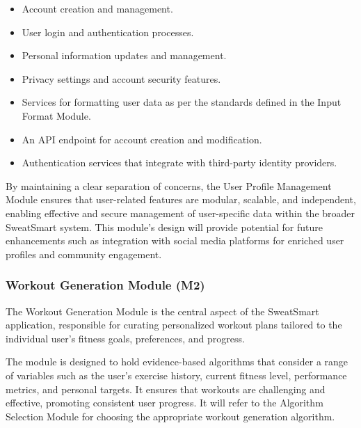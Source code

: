 \documentclass[12pt, titlepage]{article}
\begin{document}
\begin{description}[leftmargin=0pt] %
\item[Services:] 
\end{description}
\begin{itemize}[leftmargin=*]
\item Account creation and management.
\item User login and authentication processes.
\item Personal information updates and management.
\item Privacy settings and account security features.
\item Services for formatting user data as per the standards defined in the Input Format Module.
\end{itemize}

\begin{description}[leftmargin=0pt]
\item[Interfaces:] 
\end{description}
\begin{itemize}[leftmargin=*]
\item An API endpoint for account creation and modification.
\item Authentication services that integrate with third-party identity providers.
\end{itemize}

By maintaining a clear separation of concerns, the User Profile Management Module ensures that user-related features are modular, scalable, and independent, enabling effective and secure management of user-specific data within the broader SweatSmart system. This module's design will provide potential for future enhancements such as integration with social media platforms for enriched user profiles and community engagement.


\subsubsection{Workout Generation Module (M2)}

The Workout Generation Module is the central aspect of the SweatSmart application, responsible for curating personalized workout plans tailored to the individual user's fitness goals, preferences, and progress.

\begin{description}[leftmargin=0pt]
\item[Secrets:] 
The module is designed to hold evidence-based algorithms that consider a range of variables such as the user's exercise history, current fitness level, performance metrics, and personal targets. It ensures that workouts are challenging and effective, promoting consistent user progress. It will refer to the Algorithm Selection Module for choosing the appropriate workout generation algorithm.
\end{description}
\end{document}
